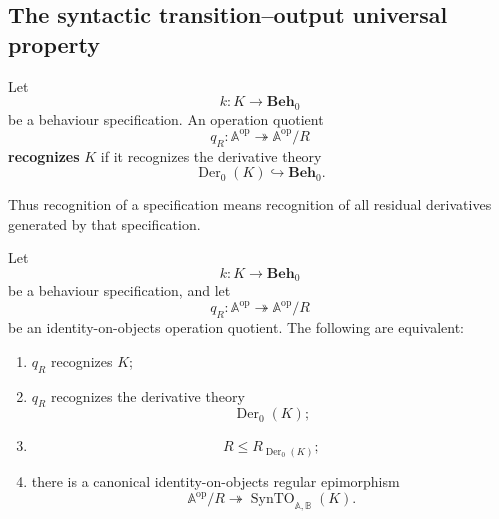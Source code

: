 \subsection{The syntactic transition--output universal property}
\label{subsec:syntactic-to-universal-property}

\begin{definition}
\label{def:operation-quotient-recognizes-specification}
    Let
    \[
        k:K\to\mathbf{Beh}_0
    \]
    be a behaviour specification. An operation quotient
    \[
        q_R:\mathbb A^{\mathrm{op}}\twoheadrightarrow
        \mathbb A^{\mathrm{op}}/R
    \]
    \textbf{recognizes} \(K\) if it recognizes the derivative theory
    \[
        \operatorname{Der}_0(K)\hookrightarrow\mathbf{Beh}_0.
    \]
\end{definition}

Thus recognition of a specification means recognition of all residual
derivatives generated by that specification.

\begin{theorem}
\label{thm:syntactic-to-universal-property}
    Let
    \[
        k:K\to\mathbf{Beh}_0
    \]
    be a behaviour specification, and let
    \[
        q_R:\mathbb A^{\mathrm{op}}\twoheadrightarrow
        \mathbb A^{\mathrm{op}}/R
    \]
    be an identity-on-objects operation quotient. The following are equivalent:
    \begin{enumerate}
        \item \(q_R\) recognizes \(K\);

        \item \(q_R\) recognizes the derivative theory
        \[
            \operatorname{Der}_0(K);
        \]

        \item
        \[
            R\leq R_{\operatorname{Der}_0(K)};
        \]

        \item there is a canonical identity-on-objects regular epimorphism
        \[
            \mathbb A^{\mathrm{op}}/R
            \twoheadrightarrow
            \operatorname{SynTO}_{\mathbb A,\mathbb B}(K).
        \]
    \end{enumerate}
\end{theorem}


